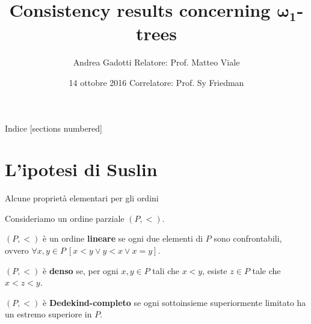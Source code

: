 \documentclass{beamer}
\title{Consistency results concerning $\pmb{\omega_1}$-trees}
\author{Andrea Gadotti \hfill Relatore: Prof. Matteo Viale}
\date{14 ottobre 2016 \hfill Correlatore: Prof. Sy Friedman}
\institute{Università di Torino}
\theoremstyle{num.custom-title}
\theoremstyle{custom-title}
\renewcommand{\emph}[1]{\textbf{#1}}
\begin{document}
\setlength{\abovedisplayskip}{1pt}
\setlength{\belowdisplayskip}{1pt}
\setlength{\abovedisplayshortskip}{1pt}
\setlength{\belowdisplayshortskip}{1pt}

\maketitle


\begin{frame}{Indice}
[sections numbered]
\tableofcontents[hideallsubsections]
\end{frame}


\section{L'ipotesi di Suslin}

\begin{frame}{Alcune proprietà elementari per gli ordini}

Consideriamo un ordine parziale $(P,<)$.

\begin{definition}
$(P,<)$ è un ordine \emph{lineare} se ogni due elementi di $P$ sono confrontabili, ovvero $\forall x,y \in P \ [x<y \vee y<x \vee x=y]$.
\end{definition}

\begin{definition}
$(P,<)$ è \emph{denso} se, per ogni $x,y \in P$ tali che $x<y$, esiste $z \in P$ tale che $x < z < y$.
\end{definition}

\begin{definition}
$(P,<)$ è \emph{Dedekind-completo} se ogni sottoinsieme superiormente limitato ha un estremo superiore in $P$.
\end{definition}

\end{frame}
\end{document}
